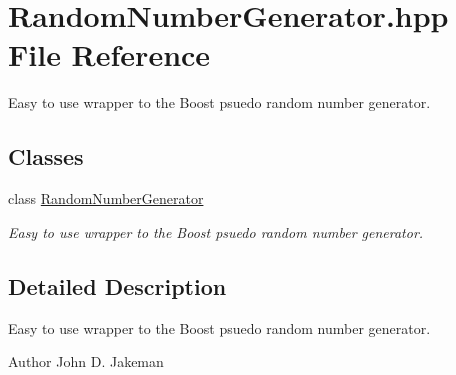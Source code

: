 \section{Random\+Number\+Generator.\+hpp File Reference}
\label{RandomNumberGenerator_8hpp}


Easy to use wrapper to the Boost psuedo random number generator.  


\subsection*{Classes}
\begin{DoxyCompactItemize}
\item 
class \hyperlink{classPecos_1_1RandomNumberGenerator}{Random\+Number\+Generator}
\begin{DoxyCompactList}\small\item\em Easy to use wrapper to the Boost psuedo random number generator. \end{DoxyCompactList}\end{DoxyCompactItemize}


\subsection{Detailed Description}
Easy to use wrapper to the Boost psuedo random number generator. 

\begin{DoxyAuthor}{Author}
John D. Jakeman 
\end{DoxyAuthor}
